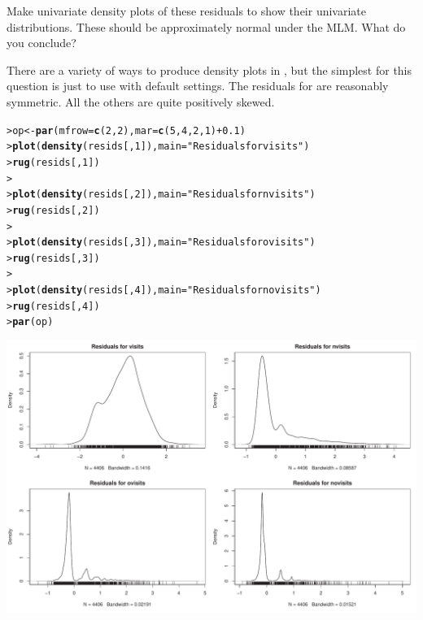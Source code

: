 \documentclass[10pt]{report}\usepackage[]{graphicx}\usepackage[]{color}
\makeatletter
\newcommand{\hlnum}[1]{\textcolor[rgb]{0.686,0.059,0.569}{#1}}%
\newcommand{\hlstr}[1]{\textcolor[rgb]{0.192,0.494,0.8}{#1}}%
\newcommand{\hlopt}[1]{\textcolor[rgb]{0,0,0}{#1}}%
\newcommand{\hlstd}[1]{\textcolor[rgb]{0.345,0.345,0.345}{#1}}%
\newcommand{\hlkwb}[1]{\textcolor[rgb]{0.69,0.353,0.396}{#1}}%
\newcommand{\hlkwc}[1]{\textcolor[rgb]{0.333,0.667,0.333}{#1}}%
\newcommand{\hlkwd}[1]{\textcolor[rgb]{0.737,0.353,0.396}{\textbf{#1}}}%
\newenvironment{kframe}{%
 \def\at@end@of@kframe{}%
 \ifinner\ifhmode%
  \def\at@end@of@kframe{\end{minipage}}%
  \begin{minipage}{\columnwidth}%
 \fi\fi%
 \def\FrameCommand##1{\hskip\@totalleftmargin \hskip-\fboxsep
 \colorbox{shadecolor}{##1}\hskip-\fboxsep
     \hskip-\linewidth \hskip-\@totalleftmargin \hskip\columnwidth}%
 \MakeFramed {\advance\hsize-\width
   \@totalleftmargin\z@ \linewidth\hsize
   \@setminipage}}%
 {\par\unskip\endMakeFramed%
 \at@end@of@kframe}
\newenvironment{knitrout}{}{} %
\renewenvironment{knitrout}{\small\renewcommand{\baselinestretch}{.85}}{} %
\makeatother
\begin{document}
\begin{Exercises}
\begin{enumerate*}
    \item Make univariate density plots of these residuals to show their univariate distributions.
    These should be approximately normal under the MLM.  What do you conclude?
    \begin{ans}
    There are a variety of ways to produce density plots in \R, but the simplest for this question is
    just to use  with default settings.
    The residuals for  are reasonably symmetric.  All the others are quite positively
    skewed.
\begin{knitrout}\footnotesize
{}\color{fgcolor}\begin{kframe}
\begin{alltt}
\hlstd{> }\hlstd{op} \hlkwb{<-} \hlkwd{par}\hlstd{(}\hlkwc{mfrow}\hlstd{=}\hlkwd{c}\hlstd{(}\hlnum{2}\hlstd{,}\hlnum{2}\hlstd{),} \hlkwc{mar}\hlstd{=}\hlkwd{c}\hlstd{(}\hlnum{5}\hlstd{,}\hlnum{4}\hlstd{,}\hlnum{2}\hlstd{,}\hlnum{1}\hlstd{)}\hlopt{+}\hlnum{0.1}\hlstd{)}
\hlstd{> }\hlkwd{plot}\hlstd{(}\hlkwd{density}\hlstd{(resids[,}\hlnum{1}\hlstd{]),} \hlkwc{main} \hlstd{=} \hlstr{"Residuals for visits"}\hlstd{)}
\hlstd{> }\hlkwd{rug}\hlstd{(resids[,}\hlnum{1}\hlstd{])}
\hlstd{> }
\hlstd{> }\hlkwd{plot}\hlstd{(}\hlkwd{density}\hlstd{(resids[,}\hlnum{2}\hlstd{]),} \hlkwc{main} \hlstd{=} \hlstr{"Residuals for nvisits"}\hlstd{)}
\hlstd{> }\hlkwd{rug}\hlstd{(resids[,}\hlnum{2}\hlstd{])}
\hlstd{> }
\hlstd{> }\hlkwd{plot}\hlstd{(}\hlkwd{density}\hlstd{(resids[,}\hlnum{3}\hlstd{]),} \hlkwc{main} \hlstd{=} \hlstr{"Residuals for ovisits"}\hlstd{)}
\hlstd{> }\hlkwd{rug}\hlstd{(resids[,}\hlnum{3}\hlstd{])}
\hlstd{> }
\hlstd{> }\hlkwd{plot}\hlstd{(}\hlkwd{density}\hlstd{(resids[,}\hlnum{4}\hlstd{]),} \hlkwc{main} \hlstd{=} \hlstr{"Residuals for novisits"}\hlstd{)}
\hlstd{> }\hlkwd{rug}\hlstd{(resids[,}\hlnum{4}\hlstd{])}
\hlstd{> }\hlkwd{par}\hlstd{(op)}
\end{alltt}
\end{kframe}

\centerline{\includegraphics[width=.6\textwidth]{soln/fig/ex11_8b-1} }




\end{knitrout}
\end{ans}
\end{enumerate*}
\end{Exercises}
\end{document}
